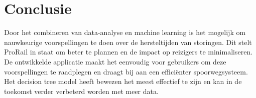 \documentclass{article}
\begin{document}
\newpage
\section{Conclusie}
Door het combineren van data-analyse en machine learning is het mogelijk om nauwkeurige voorspellingen te doen over de hersteltijden van storingen. Dit stelt ProRail in staat om beter te plannen en de impact op reizigers te minimaliseren. De ontwikkelde applicatie maakt het eenvoudig voor gebruikers om deze voorspellingen te raadplegen en draagt bij aan een efficiënter spoorwegsysteem. Het decision tree model heeft bewezen het meest effectief te zijn en kan in de toekomst verder verbeterd worden met meer data.
\end{document}
